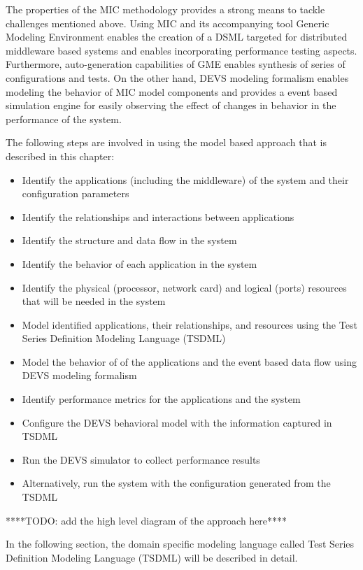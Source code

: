 The properties of the MIC methodology provides a strong means to tackle challenges mentioned above. Using MIC and its accompanying tool Generic Modeling Environment \cite{GME} enables the creation of a DSML targeted for distributed middleware based systems and enables incorporating performance testing aspects. Furthermore, auto-generation capabilities of GME enables synthesis of series of configurations and tests. On the other hand, DEVS modeling formalism enables modeling the behavior of MIC model components and provides a event based simulation engine for easily observing the effect of changes in behavior in the performance of the system.


The following steps are involved in using the model based approach that is described in this chapter:

\begin{itemize}
	\item Identify the applications (including the middleware) of the system and their configuration parameters
	\item Identify the relationships and interactions between applications
	\item Identify the structure and data flow in the system
	\item Identify the behavior of each application in the system
	\item Identify the physical (processor, network card) and logical (ports) resources that will be needed in the system
	\item Model identified applications, their relationships, and resources using the Test Series Definition Modeling Language (TSDML)
	\item Model the behavior of of the applications and the event based data flow using DEVS modeling formalism
	\item Identify performance metrics for the applications and the system
	\item Configure the DEVS behavioral model with the information captured in TSDML
	\item Run the DEVS simulator to collect performance results
	\item Alternatively, run the system with the configuration generated from the TSDML
\end{itemize}

****TODO: add the high level diagram of the approach here****

In the following section, the domain specific modeling language called Test Series Definition Modeling Language (TSDML) will be described in detail.

